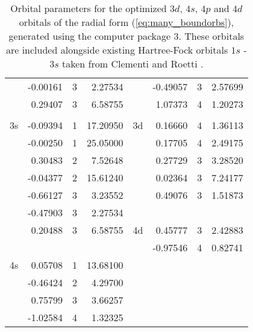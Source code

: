 \begin{table}[hbt]
\begin{center}
\begin{tabular}{@{}        l r c r     |      l r c r        @{}}
                &         -0.00161     &         3    &    2.27534    &  &   -0.49057         &     3      &  2.57699\\
                &          0.29407     &           3   &     6.58755    &   &   1.07373         &        4   &     1.20273 \\
                                   &                          &      &    &  &         &   &   \\
    \multicolumn{1}{c}{3s}                 &        -0.09394     &    1    &   17.20950    & 3d  &    0.16660        &       4      &  1.36113 \\
                  &       -0.00250    &      1   &    25.05000    &  &  0.17705      &      4    &    2.49175 \\
                  &        0.30483    &             2    &    7.52648    &  & 0.27729        &       3    &    3.28520 \\
                  &       -0.04377     &      2     &  15.61240    &  &  0.02364         &       3     &   7.24177 \\
                  &       -0.66127    &          3    &    3.23552    & & 0.49076          &  3      &  1.51873\\
                  &       -0.47903    &     3    &    2.27534    &  & & &  \\
                  &        0.20488    &           3     &   6.58755    &  4d  &   0.45777          &       3      &  2.42883\\
                                     &                          &      &    &  &     -0.97546       &        4   &     0.82741 \\
     \multicolumn{1}{c}{4s}                 &        0.05708   &          1    &   13.68100    &  &   &  &\\
                  &       -0.46424    &      2    &    4.29700    &  &   &  &\\
                  &        0.75799    &      3     &   3.66257    &  &   &  &\\
                  &       -1.02584    &       4    &    1.32325    &  &   &  &\\

         
\bottomrule
 \end{tabular}
  \caption{Orbital parameters for the optimized $3d$, $4s$, $4p$ and $4d$ orbitals of the radial form (\ref{eq:many_boundorbs}), generated using the computer package 3. These orbitals are included alongside existing Hartree-Fock orbitals $1s$ - $3s$ taken from Clementi and Roetti \cite{1974ADNDT..14..177C}. \label{tab:arg_orbitals}}
 \end{center}
\end{table}
%


